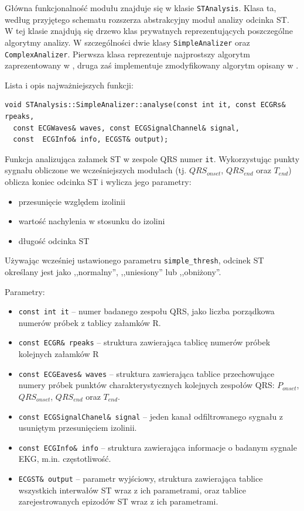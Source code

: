 \documentclass[a4paper, 11pt]{article}
\begin{document}
Główna funkcjonalność modułu znajduje się w klasie \verb|STAnalysis|. Klasa ta,
według przyjętego schematu rozszerza abstrakcyjny moduł analizy odcinka ST. W
tej klasie znajdują się drzewo klas prywatnych reprezentujących poszczególne
algorytmy analizy. W szczególności dwie klasy \verb|SimpleAnalizer| oraz
\verb|ComplexAnalizer|. Pierwsza klasa reprezentuje najprostszy algorytm
zaprezentowany w \cite[p.~155]{AUGUST1}, druga zaś implementuje zmodyfikowany
algorytm opisany w \cite{SHEN1}.

Lista i opis najważniejszych funkcji:

\begin{lstlisting}
void STAnalysis::SimpleAnalizer::analyse(const int it, const ECGRs& rpeaks,
  const ECGWaves& waves, const ECGSignalChannel& signal,
  const  ECGInfo& info, ECGST& output);
\end{lstlisting}

Funkcja analizująca załamek ST w zespole QRS numer \verb|it|. Wykorzystując
punkty sygnału obliczone we wcześniejszych modułach (tj. $QRS_{onset}$,
$QRS_{end}$ oraz $T_{end}$) oblicza koniec odcinka ST i wylicza jego parametry:
\begin{itemize}
  \item przesunięcie względem izolinii
  \item wartość nachylenia w stosunku do izolini
  \item długość odcinka ST
\end{itemize}
Używając wcześniej ustawionego parametru \verb|simple_thresh|, odcinek ST
określany jest jako ,,normalny'', ,,uniesiony'' lub ,,obniżony''.

Parametry:
\begin{itemize}
  \item \verb|const int it| -- numer badanego zespołu QRS, jako liczba
    porządkowa numerów próbek z tablicy załamków R.
  \item \verb|const ECGR& rpeaks| -- struktura zawierająca tablicę numerów
    próbek kolejnych załamków R
  \item \verb|const ECGEaves& waves| -- struktura zawierająca tablice
    przechowujące numery próbek punktów charakterystycznych kolejnych zespołów
    QRS: $P_{onset}$, $QRS_{onset}$, $QRS_{end}$ oraz $T_{end}$.
  \item \verb|const ECGSignalChanel& signal| -- jeden kanał odfiltrowanego
    sygnału z usuniętym przesunięciem izolinii.
  \item \verb|const ECGInfo& info| -- struktura zawierająca informacje o badanym
    sygnale EKG, m.in. częstotliwość.
  \item \verb|ECGST& output| -- parametr wyjściowy, struktura zawierająca
    tablice wszystkich interwałów ST wraz z ich parametrami, oraz tablice
    zarejestrowanych epizodów ST wraz z ich parametrami.
\end{itemize}
\end{document}
